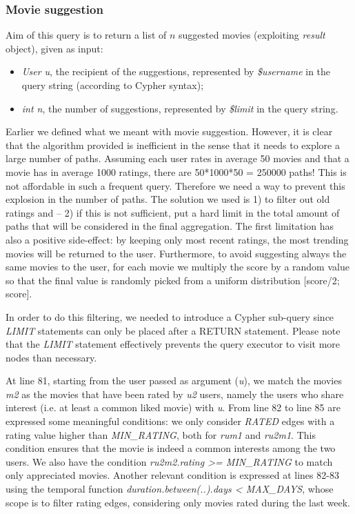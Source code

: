 \documentclass[11pt]{article}
\begin{document}
\subsubsection{Movie suggestion}
Aim of this query is to return a list of $n$ suggested movies (exploiting \emph{result} object), given as input:
\begin{itemize}
    \item \emph{User u}, the recipient of the suggestions, represented by \emph{\$username} in the query string (according to Cypher syntax);
    \item \emph{int n}, the number of suggestions, represented by \emph{\$limit} in the query string.
\end{itemize}

Earlier we defined what we meant with movie suggestion. However, it is clear that the algorithm provided is inefficient in the sense that it needs to explore a large number of paths. Assuming each user rates in average 50 movies and that a movie has in average 1000 ratings, there are 50*1000*50 = 250000 paths! This is not affordable in such a frequent query. Therefore we need a way to prevent this explosion in the number of paths. The solution we used is 1) to filter out old ratings and -- 2) if this is not sufficient, put a hard limit in the total amount of paths that will be considered in the final aggregation. The first limitation has also a positive side-effect: by keeping only most recent ratings, the most trending movies will be returned to the user. Furthermore, to avoid suggesting always the same movies to the user, for each movie we multiply the score by a random value so that the final value is randomly picked from a uniform distribution [score/2; score].

In order to do this filtering, we needed to introduce a Cypher sub-query since \emph{LIMIT} statements can only be placed after a RETURN statement. Please note that the \emph{LIMIT} statement effectively prevents the query executor to visit more nodes than necessary.



At line 81, starting from the user passed as argument (\emph{u}), we match the movies \emph{m2} as the movies that have been rated by \emph{u2} users, namely the users who share interest (i.e. at least a common liked movie) with \emph{u}. 
From line 82 to line 85 are expressed some meaningful conditions: we only consider \emph{RATED} edges with a rating value higher than \emph{MIN\_RATING}, both for \emph{rum1} and \emph{ru2m1}. This condition ensures that the movie is indeed a common interests among the two users. We also have the condition \emph{ru2m2.rating >= MIN\_RATING} to match only appreciated movies. Another relevant condition is expressed at lines 82-83 using the temporal function \emph{duration.between(..).days < MAX\_DAYS}, whose scope is to filter rating edges, considering only movies rated during the last week.
\end{document}
